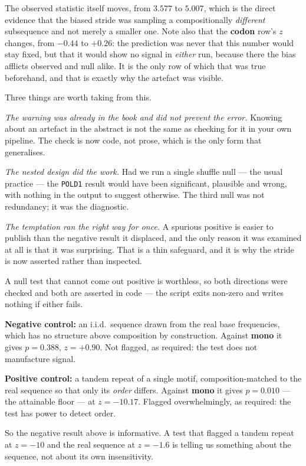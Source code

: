 \medskip
\noindent
The observed statistic itself moves, from $3.577$ to $5.007$, which is the direct
evidence that the biased stride was sampling a compositionally \emph{different}
subsequence and not merely a smaller one. Note also that the \textbf{codon} row's
$z$ changes, from $-0.44$ to $+0.26$: the prediction was never that this number
would stay fixed, but that it would show no signal in \emph{either} run, because
there the bias afflicts observed and null alike. It is the only row of which that
was true beforehand, and that is exactly why the artefact was visible.

\medskip
Three things are worth taking from this.

\emph{The warning was already in the book and did not prevent the error.} Knowing
about an artefact in the abstract is not the same as checking for it in your own
pipeline. The check is now code, not prose, which is the only form that
generalises.

\emph{The nested design did the work.} Had we run a single shuffle null --- the
usual practice --- the \texttt{POLD1} result would have been significant,
plausible and wrong, with nothing in the output to suggest otherwise. The third
null was not redundancy; it was the diagnostic.

\emph{The temptation ran the right way for once.} A spurious positive is easier
to publish than the negative result it displaced, and the only reason it was
examined at all is that it was surprising. That is a thin safeguard, and it is
why the stride is now asserted rather than inspected.

\begin{ledger}
A null test that cannot come out positive is worthless, so both directions were
checked and both are asserted in code --- the script exits non-zero and writes
nothing if either fails.

\textbf{Negative control:} an i.i.d.\ sequence drawn from the real base
frequencies, which has no structure above composition by construction. Against
\textbf{mono} it gives $p = 0.388$, $z = +0.90$. Not flagged, as required: the
test does not manufacture signal.

\textbf{Positive control:} a tandem repeat of a single motif, composition-matched
to the real sequence so that only its \emph{order} differs. Against \textbf{mono}
it gives $p = 0.010$ --- the attainable floor --- at $z = -10.17$. Flagged
overwhelmingly, as required: the test has power to detect order.

So the negative result above is informative. A test that flagged a tandem repeat
at $z = -10$ and the real sequence at $z = -1.6$ is telling us something about
the sequence, not about its own insensitivity.
\end{ledger}

